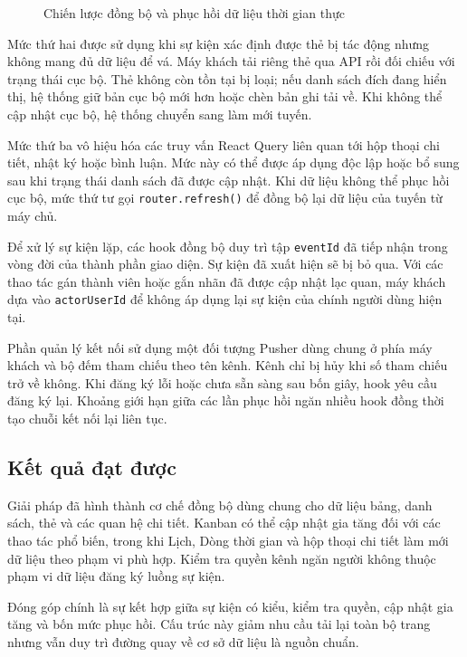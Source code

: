 \documentclass[../DoAn.tex]{subfiles}
\begin{document}
\begin{figure}[H]
    \centering
    \caption{Chiến lược đồng bộ và phục hồi dữ liệu thời gian thực}
    \label{fig:chapter5_realtime_sync_strategy}
\end{figure}

Mức thứ hai được sử dụng khi sự kiện xác định được thẻ bị tác động nhưng không mang đủ dữ liệu để vá. Máy khách tải riêng thẻ qua API rồi đối chiếu với trạng thái cục bộ. Thẻ không còn tồn tại bị loại; nếu danh sách đích đang hiển thị, hệ thống giữ bản cục bộ mới hơn hoặc chèn bản ghi tải về. Khi không thể cập nhật cục bộ, hệ thống chuyển sang làm mới tuyến.

Mức thứ ba vô hiệu hóa các truy vấn React Query liên quan tới hộp thoại chi tiết, nhật ký hoặc bình luận. Mức này có thể được áp dụng độc lập hoặc bổ sung sau khi trạng thái danh sách đã được cập nhật. Khi dữ liệu không thể phục hồi cục bộ, mức thứ tư gọi \texttt{router.refresh()} để đồng bộ lại dữ liệu của tuyến từ máy chủ.

Để xử lý sự kiện lặp, các hook đồng bộ duy trì tập \texttt{eventId} đã tiếp nhận trong vòng đời của thành phần giao diện. Sự kiện đã xuất hiện sẽ bị bỏ qua. Với các thao tác gán thành viên hoặc gắn nhãn đã được cập nhật lạc quan, máy khách dựa vào \texttt{actorUserId} để không áp dụng lại sự kiện của chính người dùng hiện tại.

Phần quản lý kết nối sử dụng một đối tượng Pusher dùng chung ở phía máy khách và bộ đếm tham chiếu theo tên kênh. Kênh chỉ bị hủy khi số tham chiếu trở về không. Khi đăng ký lỗi hoặc chưa sẵn sàng sau bốn giây, hook yêu cầu đăng ký lại. Khoảng giới hạn giữa các lần phục hồi ngăn nhiều hook đồng thời tạo chuỗi kết nối lại liên tục.

\subsection{Kết quả đạt được}
\label{subsection:5.1.3}

Giải pháp đã hình thành cơ chế đồng bộ dùng chung cho dữ liệu bảng, danh sách, thẻ và các quan hệ chi tiết. Kanban có thể cập nhật gia tăng đối với các thao tác phổ biến, trong khi Lịch, Dòng thời gian và hộp thoại chi tiết làm mới dữ liệu theo phạm vi phù hợp. Kiểm tra quyền kênh ngăn người không thuộc phạm vi dữ liệu đăng ký luồng sự kiện.

Đóng góp chính là sự kết hợp giữa sự kiện có kiểu, kiểm tra quyền, cập nhật gia tăng và bốn mức phục hồi. Cấu trúc này giảm nhu cầu tải lại toàn bộ trang nhưng vẫn duy trì đường quay về cơ sở dữ liệu là nguồn chuẩn.
\end{document}
